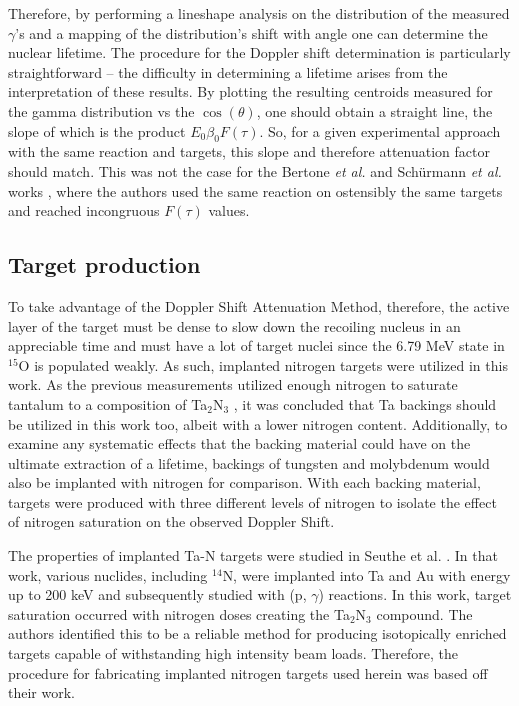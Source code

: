 Therefore, by performing a lineshape analysis on the distribution of the measured $\gamma$'s and a mapping of the distribution's shift with angle one can determine the nuclear lifetime. The procedure for the Doppler shift determination is particularly straightforward -- the difficulty in determining a lifetime arises from the interpretation of these results. By plotting the resulting centroids measured for the gamma distribution vs the $\cos(\theta)$, one should obtain a straight line, the slope of which is the product $E_{0} \beta_{0} F(\tau)$. So, for a given experimental approach with the same reaction and targets, this slope and therefore attenuation factor should match. This was not the case for the Bertone \textit{et al.} and Sch{\"u}rmann \textit{et al.} works \cite{Bertone2001, Schurmann2008}, where the authors used the same reaction on ostensibly the same targets and reached incongruous $F(\tau)$ values. 
 

\subsection{Target production}
\label{sec: implantation}

To take advantage of the Doppler Shift Attenuation Method, therefore, the active layer of the target must be dense to slow down the recoiling nucleus in an appreciable time and must have a lot of target nuclei since the 6.79 MeV state in $^{15}$O is populated weakly. As such, implanted nitrogen targets were utilized in this work. As the previous measurements utilized enough nitrogen to saturate tantalum to a composition of Ta$_{2}$N$_{3}$ \cite{Bertone2001, Schurmann2008}, it was concluded that Ta backings should be utilized in this work too, albeit with a lower nitrogen content. Additionally, to examine any systematic effects that the backing material could have on the ultimate extraction of a lifetime, backings of tungsten and molybdenum would also be implanted with nitrogen for comparison. With each backing material, targets were produced with three different levels of nitrogen to isolate the effect of nitrogen saturation on the observed Doppler Shift. 

The properties of implanted Ta-N targets were studied in Seuthe et al. \cite{Seuthe1987}. In that work, various nuclides, including $^{14}$N, were implanted into Ta and Au with energy up to 200 keV and subsequently studied with (p, $\gamma$) reactions. In this work, target saturation occurred with nitrogen doses creating the Ta$_{2}$N$_{3}$ compound. The authors identified this to be a reliable method for producing isotopically enriched targets capable of withstanding high intensity beam loads. Therefore, the procedure for fabricating implanted nitrogen targets used herein was based off their work.

